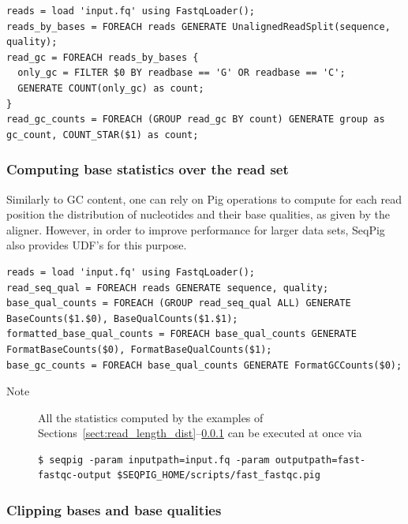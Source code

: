\begin{lstlisting}
reads = load 'input.fq' using FastqLoader();
reads_by_bases = FOREACH reads GENERATE UnalignedReadSplit(sequence, quality);
read_gc = FOREACH reads_by_bases {
  only_gc = FILTER $0 BY readbase == 'G' OR readbase == 'C';
  GENERATE COUNT(only_gc) as count;
}
read_gc_counts = FOREACH (GROUP read_gc BY count) GENERATE group as gc_count, COUNT_STAR($1) as count;
\end{lstlisting}

\subsubsection{Computing base statistics over the read set}

\label{sect:base_stats}

Similarly to GC content, one can rely on Pig operations to compute for
each read position the distribution of nucleotides and their base
qualities, as given by the aligner. However, in order to improve
performance for larger data sets, SeqPig also provides UDF's for this
purpose.

\begin{lstlisting}
reads = load 'input.fq' using FastqLoader();
read_seq_qual = FOREACH reads GENERATE sequence, quality;
base_qual_counts = FOREACH (GROUP read_seq_qual ALL) GENERATE BaseCounts($1.$0), BaseQualCounts($1.$1);
formatted_base_qual_counts = FOREACH base_qual_counts GENERATE FormatBaseCounts($0), FormatBaseQualCounts($1);
base_gc_counts = FOREACH base_qual_counts GENERATE FormatGCCounts($0);
\end{lstlisting}

\begin{description}
	\item[Note] All the statistics computed by the examples of Sections~\ref{sect:read_length_dist}--\ref{sect:base_stats} can be executed at once via
\begin{lstlisting}
$ seqpig -param inputpath=input.fq -param outputpath=fast-fastqc-output $SEQPIG_HOME/scripts/fast_fastqc.pig
\end{lstlisting}
\end{description}

\subsubsection{Clipping bases and base qualities}

\label{sect:read_clipping}

